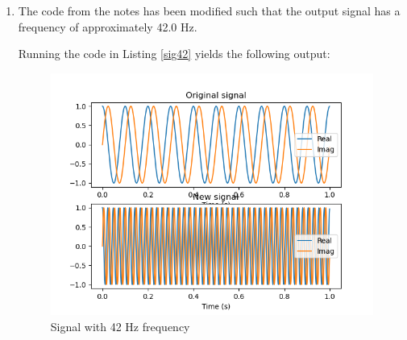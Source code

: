 \begin{enumerate}
  \item The code from the notes has been modified such that the output signal has a frequency of approximately 42.0 Hz.
        
        Running the code in Listing \ref{sig42} yields the following output:
        \begin{figure}[h!]
          \centering
          \includegraphics[scale=1.0]{ch06/figures/ex6a.png}
          \caption{Signal with 42 Hz frequency}
        \end{figure}


\end{enumerate}
